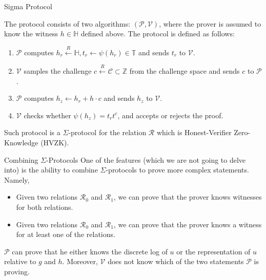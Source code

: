 \documentclass{zkdl-presentation-template}
\begin{document}
    \begin{frame}{Sigma Protocol}
        \begin{definition}
            The protocol consists of two algorithms: $(\mathcal{P}, \mathcal{V})$, where the prover is assumed to know the witness $h \in \mathbb{H}$ defined above. The protocol is defined as follows:
            \begin{enumerate}
                \item $\mathcal{P}$ computes $h_r \xleftarrow{R} \mathbb{H}, t_r \gets \psi(h_r) \in \mathbb{T}$ and sends $t_r$ to $\mathcal{V}$.
                \item $\mathcal{V}$ samples the challenge $c \xleftarrow{R} \mathcal{C} \subset \mathbb{Z}$ from the challenge space and sends $c$ to $\mathcal{P}$.
                \item $\mathcal{P}$ computes $h_z \gets h_r + h\cdot c$ and sends $h_z$ to $\mathcal{V}$.
                \item $\mathcal{V}$ checks whether $\psi(h_z) = t_r t^c$, and accepts or rejects the proof.
            \end{enumerate}
        \end{definition}

        \begin{theorem}
            Such protocol is a $\Sigma$-protocol for the relation $\mathcal{R}$ which is Honest-Verifier Zero-Knowledge (HVZK).
        \end{theorem}
    \end{frame}

    \begin{frame}{Combining $\Sigma$-Protocols}
        One of the features (which we are not going to delve into) is the ability to combine $\Sigma$-protocols to prove more complex statements. Namely,
        \begin{itemize}
            \item Given two relations $\mathcal{R}_0$ and $\mathcal{R}_1$, we can prove that the prover knows witnesses for both relations.
            \item Given two relations $\mathcal{R}_0$ and $\mathcal{R}_1$, we can prove that the prover knows a witness for at least one of the relations.
        \end{itemize}

        \begin{example}
            $\mathcal{P}$ can prove that he either knows the discrete log of $u$ or the representation of $u$ relative to $g$ and $h$. Moreover, $\mathcal{V}$ does not know which of the two statements $\mathcal{P}$ is proving.
        \end{example}
    \end{frame}
\end{document}
